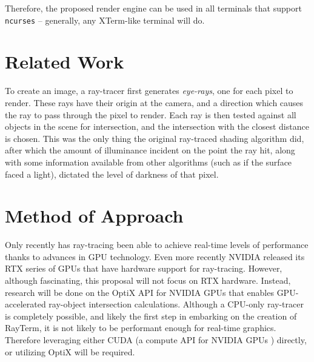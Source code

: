 \documentclass[11pt]{article}
\newcommand{\name}{{\sc RayTerm}}
\begin{document}
Therefore, the proposed render engine can be used in all terminals that support \texttt{ncurses} -- generally, any XTerm-like terminal will do.

\section{Related Work}
\label{sec:relatedwork}


To create an image, a ray-tracer first generates {\it eye-rays}, one for each pixel to render.
These rays have their origin at the camera, and a direction which causes the ray to pass through the pixel to render.
Each ray is then tested against all objects in the scene for intersection, and the intersection with the closest distance is chosen.
This was the only thing the original ray-traced shading algorithm \cite{appel1968some} did, after which the amount of illuminance incident on the point the ray hit, along with some information available from other algorithms (such as if the surface faced a light), dictated the level of darkness of that pixel.


\section{Method of Approach}
\label{sec:method}


Only recently has ray-tracing been able to achieve real-time levels of performance thanks to advances in GPU technology. Even more recently NVIDIA released its RTX series of GPUs that have hardware support for ray-tracing. However, although fascinating, this proposal will not focus on RTX hardware. Instead, research will be done on the OptiX API \cite{parker2010optix} for NVIDIA GPUs that enables GPU-accelerated ray-object intersection calculations. Although a CPU-only ray-tracer is completely possible, and likely the first step in embarking on the creation of \name, it is not likely to be performant enough for real-time graphics. Therefore leveraging either CUDA (a compute API for NVIDIA GPUs \cite{nvidia2011cuda}) directly, or utilizing OptiX will be required.
\end{document}
